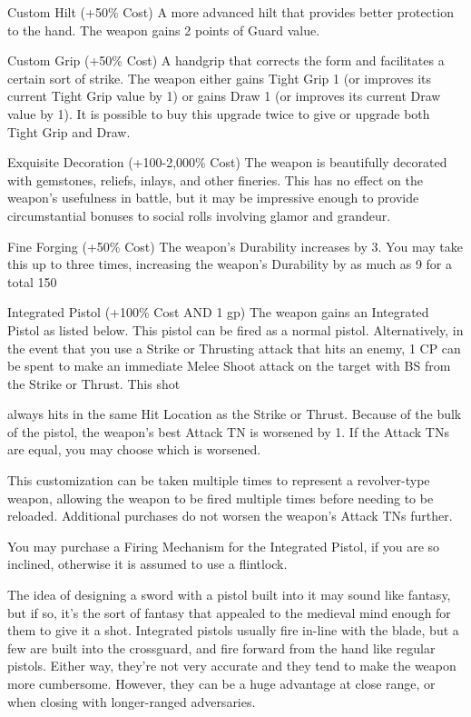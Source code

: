 \documentclass[oneside,11pt,english]{book}
\begin{document}
Custom Hilt (+50\% Cost) 
A more advanced hilt that provides better protection to the hand. The weapon gains 2 points of Guard 
value. 

 

Custom Grip (+50\% Cost) 
A handgrip that corrects the form and facilitates a certain sort of strike. The weapon either gains Tight 
Grip 1 (or improves its current Tight Grip value by 1) or gains Draw 1 (or improves its current Draw 
value by 1). It is possible to buy this upgrade twice to give or upgrade both Tight Grip and Draw. 

 

Exquisite Decoration (+100-2,000\% Cost) 
The weapon is beautifully decorated with gemstones, reliefs, inlays, and other fineries. This has no effect 
on the weapon’s usefulness in battle, but it may be impressive enough to provide circumstantial bonuses 
to social rolls involving glamor and grandeur. 

 

Fine Forging (+50\% Cost) 
The weapon’s Durability increases by 3. You may take this up to three times, increasing the weapon’s 
Durability by as much as 9 for a total 150%

 

Integrated Pistol (+100\% Cost AND 1 gp) 
The weapon gains an Integrated Pistol as listed below. This pistol can be fired as a normal pistol. 
Alternatively, in the event that you use a Strike or Thrusting attack that hits an enemy, 1 CP can be spent 
to make an immediate Melee Shoot attack on the target with BS from the Strike or Thrust. This shot 


always hits in the same Hit Location as the Strike or Thrust. Because of the bulk of the pistol, the 
weapon’s best Attack TN is worsened by 1. If the Attack TNs are equal, you may choose which is 
worsened. 

 

This customization can be taken multiple times to represent a revolver-type weapon, allowing the weapon 
to be fired multiple times before needing to be reloaded. Additional purchases do not worsen the 
weapon’s Attack TNs further. 

 

You may purchase a Firing Mechanism for the Integrated Pistol, if you are so inclined, otherwise it is 
assumed to use a flintlock. 

 

The idea of designing a sword with a pistol built into it may sound like fantasy, but if so, it’s the sort of 
fantasy that appealed to the medieval mind enough for them to give it a shot. Integrated pistols usually 
fire in-line with the blade, but a few are built into the crossguard, and fire forward from the hand like 
regular pistols. Either way, they’re not very accurate and they tend to make the weapon more 
cumbersome. However, they can be a huge advantage at close range, or when closing with longer-ranged 
adversaries. 
\end{document}
